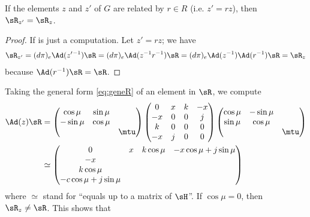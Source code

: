 \begin{proposition}
	If the elements $z$ and $z'$ of $G$ are related by $r\in R$ (i.e. $z'=rz$), then $\sR_{z'}=\sR_z$.
\end{proposition}

\begin{proof}
	If is just a computation. Let $z'=rz$; we have
	\begin{equation}
		\begin{split}
			\sR_{z'}=(d\pi)_e\Ad(z'\,\!^{-1})\sR
			=(d\pi)_e\Ad(z^{-1} r^{-1})\sR
			=(d\pi)_e\Ad(z^{-1})\Ad(r^{-1})\sR
			=\sR_z
		\end{split}
	\end{equation}
	because $\Ad(r^{-1})\sR=\sR$.
\end{proof}

Taking the general form \eqref{eq:geneR} of an element in $\sR$, we compute
\begin{equation}
	\begin{split}
		\Ad(z)\sR & =
		\begin{pmatrix}
			\cos\mu  & \sin\mu        \\
			-\sin\mu & \cos\mu        \\
			         &         & \mtu
		\end{pmatrix}
		\begin{pmatrix}
			0  & x & k & -x \\
			-x & 0 & 0 & j  \\
			k  & 0 & 0 & 0  \\
			-x & j & 0 & 0
		\end{pmatrix}
		\begin{pmatrix}
			\cos\mu & -\sin\mu        \\
			\sin\mu & \cos\mu         \\
			        &          & \mtu
		\end{pmatrix}
		\\
		          & \simeq
		\begin{pmatrix}
			0 & x & k\cos\mu & -x\cos\mu+j\sin\mu \\
			-x                                    \\
			k\cos\mu                              \\
			-c\cos\mu+j\sin\mu
		\end{pmatrix}
	\end{split}
\end{equation}
where $\simeq$ stand for ``equals up to a matrix of $\sH$''. If $\cos\mu=0$, then $\sR_z\neq\sR$. This shows that
